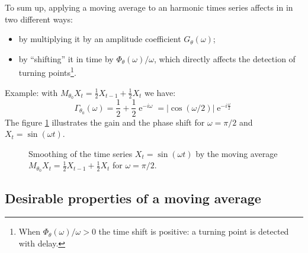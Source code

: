 \documentclass[
  12pt,
  ,
  a4paper]{article}
\DeclareMathOperator{\e}{e}
\newcommand\1{\mathds{1}}
\begin{document}
To sum up, applying a moving average to an harmonic times series affects in in two different ways:

\begin{itemize}
\item
  by multiplying it by an amplitude coefficient \(G_{\theta}\left(\omega\right)\);
\item
  by ``shifting'' it in time by \(\Phi_\theta(\omega)/\omega\), which directly affects the detection of turning points\footnote{When \(\Phi_\theta(\omega)/\omega>0\) the time shift is positive: a turning point is detected with delay.}.
\end{itemize}

Example: with \(M_{\theta_0}X_t=\frac{1}{2}X_{t-1}+\frac{1}{2}X_{t}\) we have:
\[
\Gamma_{\theta_0}(\omega)=\frac{1}{2}+\frac{1}{2}\e^{-i\omega}
=\lvert\cos(\omega/2)\rvert\e^{-i\frac{\omega}{2}}
\]
The figure \ref{fig:exgainPhase} illustrates the gain and the phase shift for \(\omega=\pi/2\) and \(X_t=\sin(\omega t)\).

\begin{figure}[!ht]
\caption{Smoothing of the time series $X_t=\sin(\omega t)$ by the moving average $M_{\theta_0}X_t=\frac{1}{2}X_{t-1}+\frac{1}{2}X_{t}$ for $\omega=\pi/2$.}\label{fig:exgainPhase}
\end{figure}

\hypertarget{desirable-properties-of-a-moving-average}{%
\subsection{Desirable properties of a moving average}\label{desirable-properties-of-a-moving-average}}
\end{document}
